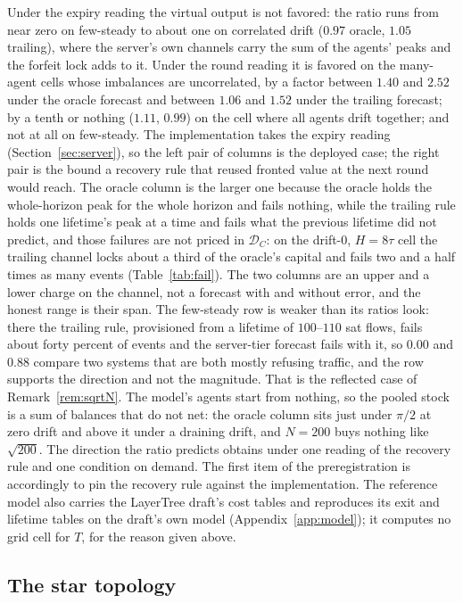 \documentclass[11pt]{article}
\theoremstyle{plain}
\theoremstyle{definition}
\theoremstyle{remark}
\newcommand{\Dur}{\mathcal{D}}
\begin{document}
Under the expiry reading the virtual output is not favored: the ratio runs from near zero on few-steady to about one on correlated drift ($0.97$ oracle, $1.05$ trailing), where the server's own channels carry the sum of the agents' peaks and the forfeit lock adds to it. Under the round reading it is favored on the many-agent cells whose imbalances are uncorrelated, by a factor between $1.40$ and $2.52$ under the oracle forecast and between $1.06$ and $1.52$ under the trailing forecast; by a tenth or nothing ($1.11$, $0.99$) on the cell where all agents drift together; and not at all on few-steady. The implementation takes the expiry reading (Section~\ref{sec:server}), so the left pair of columns is the deployed case; the right pair is the bound a recovery rule that reused fronted value at the next round would reach. The oracle column is the larger one because the oracle holds the whole-horizon peak for the whole horizon and fails nothing, while the trailing rule holds one lifetime's peak at a time and fails what the previous lifetime did not predict, and those failures are not priced in $\Dur_C$: on the drift-$0$, $H=8\tau$ cell the trailing channel locks about a third of the oracle's capital and fails two and a half times as many events (Table~\ref{tab:fail}). The two columns are an upper and a lower charge on the channel, not a forecast with and without error, and the honest range is their span. The few-steady row is weaker than its ratios look: there the trailing rule, provisioned from a lifetime of $100$--$110$ sat flows, fails about forty percent of events and the server-tier forecast fails with it, so $0.00$ and $0.88$ compare two systems that are both mostly refusing traffic, and the row supports the direction and not the magnitude. That is the reflected case of Remark~\ref{rem:sqrtN}. The model's agents start from nothing, so the pooled stock is a sum of balances that do not net: the oracle column sits just under $\pi/2$ at zero drift and above it under a draining drift, and $N=200$ buys nothing like $\sqrt{200}$. The direction the ratio predicts obtains under one reading of the recovery rule and one condition on demand. The first item of the preregistration is accordingly to pin the recovery rule against the implementation. The reference model also carries the LayerTree draft's cost tables and reproduces its exit and lifetime tables on the draft's own model (Appendix~\ref{app:model}); it computes no grid cell for $T$, for the reason given above.

\subsection{The star topology}
\end{document}
